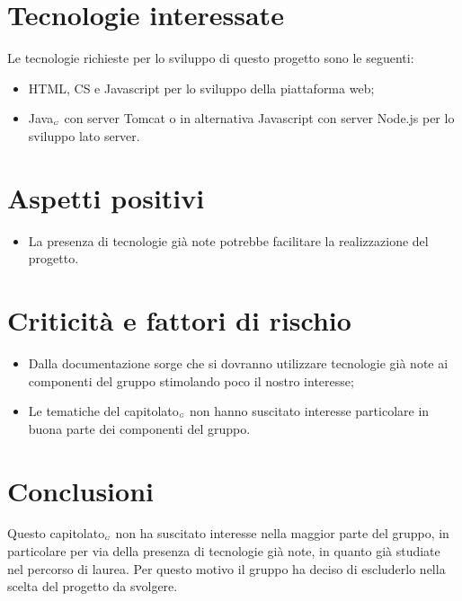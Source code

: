 \section{Tecnologie interessate} \label{C4TecnologieInteressate}
Le tecnologie richieste per lo sviluppo di questo progetto sono le seguenti:
\begin{itemize}
	\item HTML, CS e Javascript per lo sviluppo della piattaforma web;
	\item Java$_{\scaleto{G}{3pt}}$ con server Tomcat o in alternativa Javascript con server Node.js per lo sviluppo lato server.
\end{itemize}
\section{Aspetti positivi} \label{C4AspettiPositivi}
\begin{itemize}
	\item La presenza di tecnologie già note potrebbe facilitare la realizzazione del progetto.
\end{itemize}
\section{Criticità e fattori di rischio} \label{C4CriticitàEFattoriDiRischio}
\begin{itemize}
	\item Dalla documentazione sorge che si dovranno utilizzare tecnologie già note ai componenti del gruppo stimolando poco il nostro interesse;
	\item Le tematiche del capitolato$_{\scaleto{G}{3pt}}$ non hanno suscitato interesse particolare in buona parte dei componenti del gruppo.
\end{itemize}
\section{Conclusioni} \label{C4Conclusioni}
Questo capitolato$_{\scaleto{G}{3pt}}$ non ha suscitato interesse nella maggior parte del gruppo, in particolare per via della presenza di tecnologie già note, in quanto già studiate nel percorso di laurea. Per questo motivo il gruppo ha deciso di escluderlo nella scelta del progetto da svolgere.